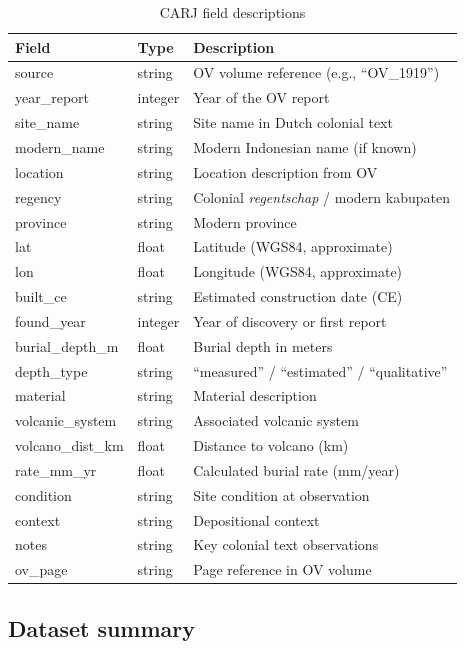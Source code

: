 \documentclass[11pt]{article}
\begin{document}
\begin{table}[h]
\centering
\small
\caption{CARJ field descriptions}
\begin{tabular}{llp{6.5cm}}
\toprule
\textbf{Field} & \textbf{Type} & \textbf{Description} \\
\midrule
source & string & OV volume reference (e.g., ``OV\_1919'') \\
year\_report & integer & Year of the OV report \\
site\_name & string & Site name in Dutch colonial text \\
modern\_name & string & Modern Indonesian name (if known) \\
location & string & Location description from OV \\
regency & string & Colonial \textit{regentschap} / modern kabupaten \\
province & string & Modern province \\
lat & float & Latitude (WGS84, approximate) \\
lon & float & Longitude (WGS84, approximate) \\
built\_ce & string & Estimated construction date (CE) \\
found\_year & integer & Year of discovery or first report \\
burial\_depth\_m & float & Burial depth in meters \\
depth\_type & string & ``measured'' / ``estimated'' / ``qualitative'' \\
material & string & Material description \\
volcanic\_system & string & Associated volcanic system \\
volcano\_dist\_km & float & Distance to volcano (km) \\
rate\_mm\_yr & float & Calculated burial rate (mm/year) \\
condition & string & Site condition at observation \\
context & string & Depositional context \\
notes & string & Key colonial text observations \\
ov\_page & string & Page reference in OV volume \\
\bottomrule
\end{tabular}
\end{table}

\subsection{Dataset summary}
\end{document}
